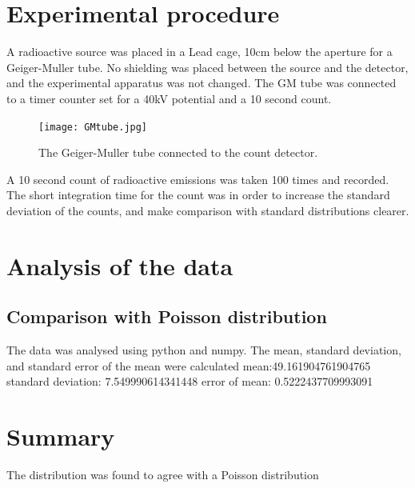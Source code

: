 \documentclass[10pt]{iopart}
\begin{document}
\section{Experimental procedure}

A radioactive source was placed in a Lead cage, 10cm below the aperture for a Geiger-Muller tube. No shielding was placed between the source and the detector, and the experimental apparatus was not changed. The GM tube was connected to a timer counter set for a 40kV potential and a 10 second count.
\begin{figure}[htbp]
\begin{center}
\texttt{[image: GMtube.jpg]}
\caption{The Geiger-Muller tube connected to the count detector.}
\label{default}
\end{center}
\end{figure}


A 10 second count of radioactive emissions was taken 100 times and recorded. The short integration time for the count was in order to increase the standard deviation of the counts, and make comparison with standard distributions clearer.


\section{Analysis of the data}

\subsection{Comparison with Poisson distribution}

The data was analysed using python and numpy. The mean, standard deviation, and standard error of the mean were calculated
mean:49.161904761904765
standard deviation: 7.549990614341448
error of mean: 0.5222437709993091

    
\section{Summary}

The distribution was found to agree with a Poisson distribution 
\end{document}
